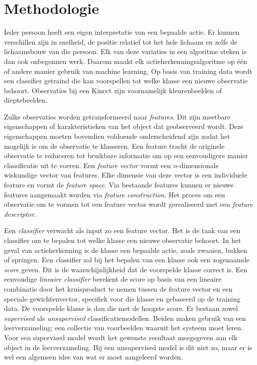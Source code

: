 \chapter{Methodologie}
\label{ch:methodologie}

Ieder persoon heeft een eigen interpretatie van een bepaalde actie. Er kunnen verschillen zijn in snelheid, de positie relatief tot het hele lichaam en zelfs de lichaamsbouw van die persoon. Elk van deze variaties in een algoritme steken is dan ook onbegonnen werk. Daarom maakt elk actieherkenningsalgoritme op één of andere manier gebruik van machine learning. Op basis van training data wordt een classifier getraind die kan voorspellen tot welke klasse een nieuwe observatie behoort. Observaties bij een Kinect zijn voornamelijk kleurenbeelden of dieptebeelden. 

Zulke observaties worden getransformeerd naar \textit{features}. Dit zijn meetbare eigenschappen of karakteristieken van het object dat geobserveerd wordt. Deze eigenschappen moeten bovendien voldoende onderscheidend zijn zodat het mogelijk is om de observatie te klasseren. Een feature tracht de originele observatie te reduceren tot bruikbare informatie om op een eenvoudigere manier classificatie uit te voeren. Een \textit{feature vector} vormt een $n$-dimensionale wiskundige vector van features. Elke dimensie van deze vector is een individuele feature en vormt de \textit{feature space}. Via bestaande features kunnen er nieuwe features aangemaakt worden via \textit{feature construction}. Het proces om een observatie om te vormen tot een feature vector wordt gerealiseerd met een \textit{feature descriptor}.

Een \textit{classifier} verwacht als input zo een feature vector. Het is de taak van een classifier om te bepalen tot welke klasse een nieuwe observatie behoort. In het geval van actieherkenning is de klasse een bepaalde actie, zoals zwaaien, bukken of springen. Een classifier zal bij het bepalen van een klasse ook een zogenaamde \textit{score} geven. Dit is de waarschijnlijkheid dat de voorspelde klasse correct is. Een eenvoudige \textit{lineaire classifier} berekent de score op basis van een lineaire combinatie door het kruisproduct te nemen tussen de feature vector en een speciale gewichtenvector, specifiek voor die klasse en gebaseerd op de training data. De voorspelde klasse is dan die met de hoogste score. Er bestaan zowel \textit{supervised} als \textit{unsupervised} classificatiemodellen. Beiden maken gebruik van een leerverzameling; een collectie van voorbeelden waaruit het systeem moet leren. Voor een supervised model wordt het gewenste resultaat meegegeven aan elk object in de leerverzameling. Bij een unsupervised model is dit niet zo, maar er is wel een algemeen idee van wat er moet aangeleerd worden.

